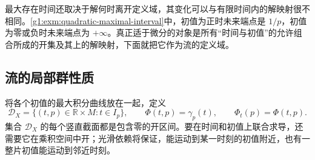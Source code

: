 \ProseParagraphBreak

最大存在时间还取决于解何时离开定义域，其变化可以与有限时间内的解映射很不相同。\cref{g1:exm:quadratic-maximal-interval}中，初值为正时未来端点是 \(1/p\)，初值为零或负时未来端点为 \(+\infty\)。真正适于微分的对象是所有“时间与初值”的允许组合所成的开集及其上的解映射，下面就把它作为流的定义域。
\subsection{流的局部群性质}
\label{g1:subsec:1301:03}

将各个初值的最大积分曲线放在一起，定义
\[
	\mathcal D_X=\{(t,p)\in\mathbb R\times M:t\in I_p\},\qquad
	\Phi(t,p)=\gamma_p(t),\qquad \Phi_t(p)=\Phi(t,p).
\]
集合 \(\mathcal D_X\) 的每个竖直截面都是包含零的开区间。要在时间和初值上联合求导，还需要它在乘积空间中开；光滑依赖将保证，能运动到某一时刻的初值附近，也有一整片初值能运动到邻近时刻。

